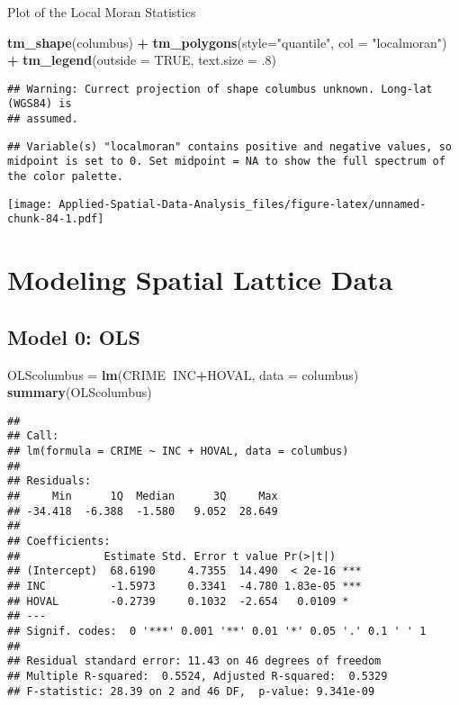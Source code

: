 \documentclass[
]{book}
\newenvironment{Shaded}{\begin{snugshade}}{\end{snugshade}}
\newcommand{\DataTypeTok}[1]{\textcolor[rgb]{0.13,0.29,0.53}{#1}}
\newcommand{\FloatTok}[1]{\textcolor[rgb]{0.00,0.00,0.81}{#1}}
\newcommand{\KeywordTok}[1]{\textcolor[rgb]{0.13,0.29,0.53}{\textbf{#1}}}
\newcommand{\NormalTok}[1]{#1}
\newcommand{\OperatorTok}[1]{\textcolor[rgb]{0.81,0.36,0.00}{\textbf{#1}}}
\newcommand{\OtherTok}[1]{\textcolor[rgb]{0.56,0.35,0.01}{#1}}
\newcommand{\StringTok}[1]{\textcolor[rgb]{0.31,0.60,0.02}{#1}}
\begin{document}
Plot of the Local Moran Statistics

\begin{Shaded}
\begin{Highlighting}[]
\KeywordTok{tm_shape}\NormalTok{(columbus) }\OperatorTok{+}\StringTok{ }\KeywordTok{tm_polygons}\NormalTok{(}\DataTypeTok{style=}\StringTok{"quantile"}\NormalTok{, }\DataTypeTok{col =} \StringTok{"localmoran"}\NormalTok{) }\OperatorTok{+}
\StringTok{     }\KeywordTok{tm_legend}\NormalTok{(}\DataTypeTok{outside =} \OtherTok{TRUE}\NormalTok{, }\DataTypeTok{text.size =} \FloatTok{.8}\NormalTok{)}
\end{Highlighting}
\end{Shaded}

\begin{verbatim}
## Warning: Currect projection of shape columbus unknown. Long-lat (WGS84) is
## assumed.
\end{verbatim}

\begin{verbatim}
## Variable(s) "localmoran" contains positive and negative values, so midpoint is set to 0. Set midpoint = NA to show the full spectrum of the color palette.
\end{verbatim}

\texttt{[image: Applied-Spatial-Data-Analysis\_files/figure-latex/unnamed-chunk-84-1.pdf]}

\hypertarget{modeling-spatial-lattice-data}{%
\section{Modeling Spatial Lattice Data}\label{modeling-spatial-lattice-data}}

\hypertarget{model-0-ols}{%
\subsection{Model 0: OLS}\label{model-0-ols}}

\begin{Shaded}
\begin{Highlighting}[]
\NormalTok{OLScolumbus =}\StringTok{ }\KeywordTok{lm}\NormalTok{(CRIME}\OperatorTok{~}\NormalTok{INC}\OperatorTok{+}\NormalTok{HOVAL, }\DataTypeTok{data =}\NormalTok{ columbus)}
\KeywordTok{summary}\NormalTok{(OLScolumbus)}
\end{Highlighting}
\end{Shaded}

\begin{verbatim}
## 
## Call:
## lm(formula = CRIME ~ INC + HOVAL, data = columbus)
## 
## Residuals:
##     Min      1Q  Median      3Q     Max 
## -34.418  -6.388  -1.580   9.052  28.649 
## 
## Coefficients:
##             Estimate Std. Error t value Pr(>|t|)    
## (Intercept)  68.6190     4.7355  14.490  < 2e-16 ***
## INC          -1.5973     0.3341  -4.780 1.83e-05 ***
## HOVAL        -0.2739     0.1032  -2.654   0.0109 *  
## ---
## Signif. codes:  0 '***' 0.001 '**' 0.01 '*' 0.05 '.' 0.1 ' ' 1
## 
## Residual standard error: 11.43 on 46 degrees of freedom
## Multiple R-squared:  0.5524,	Adjusted R-squared:  0.5329 
## F-statistic: 28.39 on 2 and 46 DF,  p-value: 9.341e-09
\end{verbatim}
\end{document}
